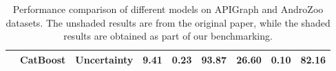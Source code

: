 \begin{table*}[htbp]
\begin{tabular}{c|c|c|ccc|ccc}
        \cline{2-9}                                                                                       &  \cellcolor{gray!20} CatBoost & \cellcolor{gray!20} Uncertainty & \cellcolor{gray!20} \textbf{9.41} & \cellcolor{gray!20} \textbf{0.23} & \cellcolor{gray!20} \textbf{93.87} & \cellcolor{gray!20} 26.60 & \cellcolor{gray!20} 0.10 & \cellcolor{gray!20} 82.16 \\
        \hline
    \end{tabular}
    \vspace{10pt}
    \caption{Performance comparison of different models on APIGraph and AndroZoo datasets.  The unshaded results are from the original paper, while the  shaded results are obtained as part of our benchmarking.}
    \label{tab:chen_dataset_comparison}
\end{table*}
